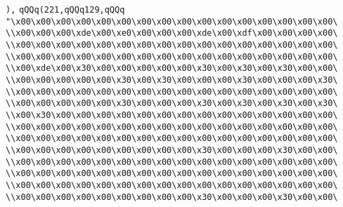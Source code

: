 \verb|),|\newline
\verb|qQQq(221,qQQq129,qQQq|\newline
\verb|"\x00\x00\x00\x00\x00\x00\x00\x00\x00\x00\x00\x00\x00\x00\x00\x00\|\newline
\verb|\\x00\x00\x00\xde\x00\xe0\x00\x00\x00\xde\x00\xdf\x00\x00\x00\x00\|\newline
\verb|\\x00\x00\x00\x00\x00\x00\x00\x00\x00\x00\x00\x00\x00\x00\x00\x00\|\newline
\verb|\\x00\x00\x00\x00\x00\x00\x00\x00\x00\x00\x00\x00\x00\x00\x00\x00\|\newline
\verb|\\x00\xde\x00\x30\x00\x00\x00\x00\x00\x30\x00\x30\x00\x30\x00\x00\|\newline
\verb|\\x00\x00\x00\x00\x00\x30\x00\x30\x00\x00\x00\x30\x00\x00\x00\x30\|\newline
\verb|\\x00\x00\x00\x00\x00\x00\x00\x00\x00\x00\x00\x00\x00\x00\x00\x00\|\newline
\verb|\\x00\x00\x00\x00\x00\x30\x00\x00\x00\x30\x00\x30\x00\x30\x00\x30\|\newline
\verb|\\x00\x30\x00\x00\x00\x00\x00\x00\x00\x00\x00\x00\x00\x00\x00\x00\|\newline
\verb|\\x00\x00\x00\x00\x00\x00\x00\x00\x00\x00\x00\x00\x00\x00\x00\x00\|\newline
\verb|\\x00\x00\x00\x00\x00\x00\x00\x00\x00\x00\x00\x00\x00\x00\x00\x00\|\newline
\verb|\\x00\x00\x00\x00\x00\x00\x00\x00\x00\x30\x00\x00\x00\x30\x00\x00\|\newline
\verb|\\x00\x00\x00\x00\x00\x00\x00\x00\x00\x00\x00\x00\x00\x00\x00\x00\|\newline
\verb|\\x00\x00\x00\x00\x00\x00\x00\x00\x00\x00\x00\x00\x00\x00\x00\x00\|\newline
\verb|\\x00\x00\x00\x00\x00\x00\x00\x00\x00\x00\x00\x00\x00\x00\x00\x00\|\newline
\verb|\\x00\x00\x00\x00\x00\x00\x00\x00\x00\x30\x00\x00\x00\x30\x00\x00\|\newline
